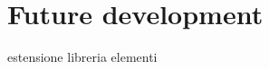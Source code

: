 \documentclass{sig-alternate}
\begin{document}
\section{Future development}

estensione libreria elementi




%

%
%
\end{document}
